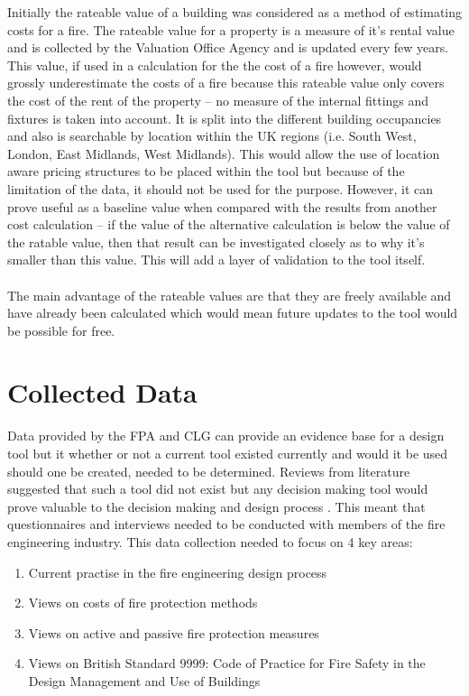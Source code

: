 \documentclass[table,a4paper,oneside]{book}
\begin{document}
Initially the rateable value of a building was considered as a method of estimating costs for a fire. The rateable value for a property is a measure of it's rental value and is collected by the Valuation Office Agency and is updated every few years. This value, if used in a calculation for the the cost of a fire however, would grossly underestimate the costs of a fire because this rateable value only covers the cost of the rent of the property – no measure of the internal fittings and fixtures is taken into account. It is split into the different building occupancies and also is searchable by location within the UK regions (i.e. South West, London, East Midlands, West Midlands). This would allow the use of location aware pricing structures to be placed within the tool but because of the limitation of the data, it should not be used for the purpose. However, it can prove useful as a baseline value when compared with the results from another cost calculation – if the value of the alternative calculation is below the value of the ratable value, then that result can be investigated closely as to why it's smaller than this value. This will add a layer of validation to the tool itself.
\\
\\
The main advantage of the rateable values are that they are freely available and have already been calculated which would mean future updates to the tool would be possible for free.

\section{Collected Data}
\label{sec:Collected Data}
Data provided by the \ac{FPA} and \ac{CLG} can provide an evidence base for a design tool but it whether or not a current tool existed currently and would it be used should one be created, needed to be determined. Reviews from literature suggested that such a tool did not exist \citep{Page2005} but any decision making tool would prove valuable to the decision making and design process \citep{BrianJ.Meacham05012004}. This meant that questionnaires and interviews needed to be conducted with members of the fire engineering industry. This data collection needed to focus on 4 key areas:
\begin{enumerate}
\item Current practise in the fire engineering design process
\item Views on costs of fire protection methods
\item Views on active and passive fire protection measures
\item Views on British Standard 9999: Code of Practice for Fire Safety in the Design Management and Use of Buildings
\end{enumerate}
\end{document}

